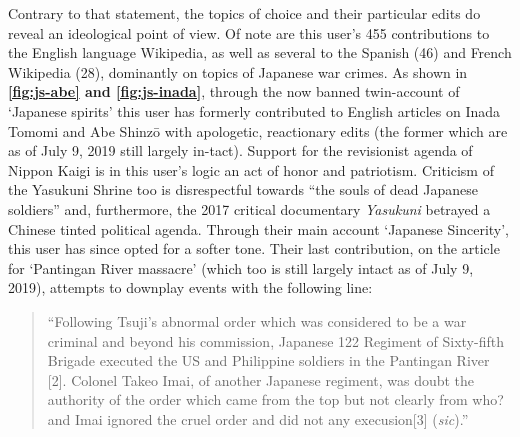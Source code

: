 \documentclass[10pt,british,A4paper,,openany]{memoir}
\begin{document}
Contrary to that statement, the topics of choice and their particular
edits do reveal an ideological point of view. Of note are this user's
455 contributions to the English language Wikipedia, as well as several
to the Spanish (46) and French Wikipedia (28), dominantly on topics of
Japanese war crimes. As shown in \textbf{\ref{fig:js-abe} and
\ref{fig:js-inada}}, through the now banned twin-account of `Japanese
spirits' this user has formerly contributed to English articles on Inada
Tomomi and Abe Shinzō with apologetic, reactionary edits (the former
which are as of July 9, 2019 still largely in-tact). Support for the
revisionist agenda of Nippon Kaigi is in this user's logic an act of
honor and patriotism. Criticism of the Yasukuni Shrine too is
disrespectful towards ``the souls of dead Japanese soldiers'' and,
furthermore, the 2017 critical documentary \emph{Yasukuni} betrayed a
Chinese tinted political agenda. Through their main account `Japanese
Sincerity', this user has since opted for a softer tone. Their last
contribution, on the article for `Pantingan River massacre' (which too
is still largely intact as of July 9, 2019), attempts to downplay events
with the following line:

\begin{quote}
``Following Tsuji's abnormal order which was considered to be a war
criminal and beyond his commission, Japanese 122 Regiment of Sixty-fifth
Brigade executed the US and Philippine soldiers in the Pantingan River
{[}2{]}. Colonel Takeo Imai, of another Japanese regiment, was doubt the
authority of the order which came from the top but not clearly from who?
and Imai ignored the cruel order and did not any execusion{[}3{]}
(\emph{sic}).''
\end{quote}
\end{document}
